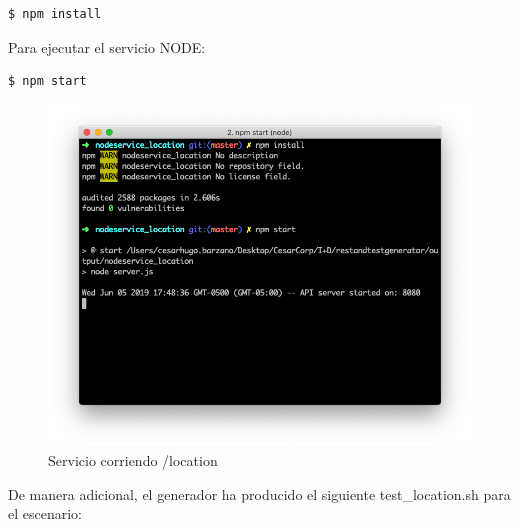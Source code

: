 \documentclass[a4paper,11pt]{book}
\begin{document}
\begin{lstlisting}[language=python,caption={ Ejemplo instalación /location }]
$ npm install
\end{lstlisting} 

Para ejecutar el servicio NODE: 

\begin{lstlisting}[language=python,caption={ Ejemplo Ejecución /location }]
$ npm start
\end{lstlisting} 

\begin{figure}[H]  
\centering 
\includegraphics[scale=0.35]{imagenes/t23.png}
\caption{ Servicio corriendo /location }  
\end{figure}


De manera adicional, el generador ha producido el siguiente test\_location.sh para el escenario:
\end{document}
